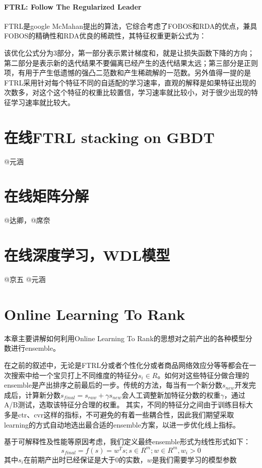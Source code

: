 \paragraph{FTRL: Follow The Regularized Leader}
FTRL是google McMahan提出的算法，它综合考虑了FOBOS和RDA的优点，兼具FOBOS的精确性和RDA优良的稀疏性，其特征权重更新公式为：

该优化公式分为3部分，第一部分表示累计梯度和，就是让损失函数下降的方向；第二部分是表示新的迭代结果不要偏离已经产生的迭代结果太远；第三部分是正则项，有用于产生低遗憾的强凸二范数和产生稀疏解的一范数。另外值得一提的是FTRL采用针对每个特征不同的自适配的学习速率，直观的解释是如果特征出现的次数多，对这个这个特征的权重比较置信，学习速率就比较小，对于很少出现的特征学习速率就比较大。

\section{在线FTRL stacking on GBDT}
	@元涵

\section{在线矩阵分解}
	@达卿，@席奈

\section{在线深度学习，WDL模型} 
	@京五 @元涵

\section{Online Learning To Rank} 
本章主要讲解如何利用Online Learning To Rank的思想对之前产出的各种模型分数进行ensemble。

在之前的叙述中，无论是FTRL分或者个性化分或者商品网络效应分等等都会在一次搜索中给一个宝贝打上不同维度的特征分$s_i\in R$。如何对这些特征分做合理的ensemble是产出排序之前最后的一步。传统的方法，每当有一个新分数$s_{new}$开发完成后，计算新分数$s_{final} = s_{raw} + \gamma s_{new}$会人工调整新加特征分数的权重$\gamma$，通过A/B测试，选取该特征分合理的权重。
其实，不同的特征分之间由于训练目标大多是ctr、cvr这样的指标，不可避免的有着一些耦合性，因此我们期望采取learning的方式自动地选出最合适的ensemble方案，以进一步优化线上指标。

基于可解释性及性能等原因考虑，我们定义最终ensemble形式为线性形式如下：
$$s_{final} = f(s) = w^Ts; s\in R^m; w\in R^m, w_i>0$$
其中$s_i$在前期产出时已经保证是大于0的实数，$w$是我们需要学习的模型参数

